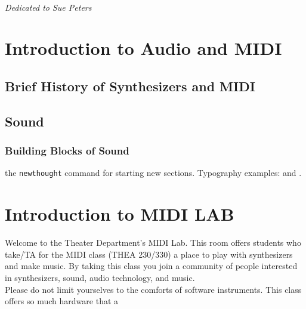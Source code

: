 \documentclass{tufte-book} %
\begin{document}
\cleardoublepage
~\vfill
\begin{doublespace}
\noindent\fontsize{18}{22}\selectfont\itshape
\nohyphenation
Dedicated to Sue Peters
\end{doublespace}
\vfill
\vfill
\graphicspath{{LaTeX/}}
\justify
\cleardoublepage
\chapter{Introduction to Audio and MIDI} %

\section{Brief History of Synthesizers and MIDI}
\section{Sound}
\subsection{Building Blocks of Sound}


 the \texttt{newthought} command for starting new sections. Typography examples:  and .


\mainmatter

\chapter{Introduction to MIDI LAB}
\label{MIDI Intro}

\begin{fullwidth}

Welcome to the  Theater Department's MIDI Lab. This room offers students who take/TA for the MIDI class (THEA 230/330) a place to play with synthesizers and make music. By taking this class you join a community of people interested in synthesizers, sound, audio technology, and music. \\

Please do not limit yourselves to the comforts of software instruments. This class offers so much hardware that a





	
\end{fullwidth}
\end{document}
